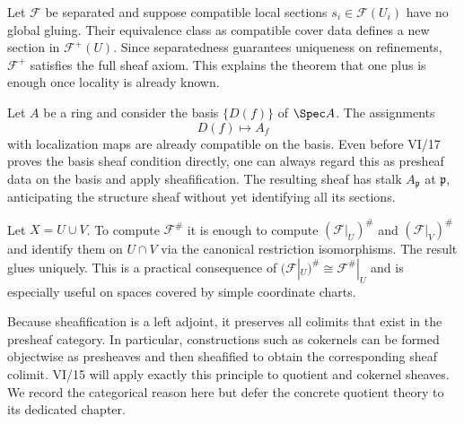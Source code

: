 \begin{example}
Let $\mathcal F$ be separated and suppose compatible local sections $s_i\in\mathcal F(U_i)$
have no global gluing.  Their equivalence class as compatible cover data defines a new
section in $\mathcal F^+(U)$.  Since separatedness guarantees uniqueness on refinements,
$\mathcal F^+$ satisfies the full sheaf axiom.  This explains the theorem that one plus is
enough once locality is already known.
\end{example}

\begin{example}
Let $A$ be a ring and consider the basis $\{D(f)\}$ of $\Spec A$.  The assignments
\[
D(f)\longmapsto A_f
\]
with localization maps are already compatible on the basis.  Even before VI/17 proves the
basis sheaf condition directly, one can always regard this as presheaf data on the basis and
apply sheafification.  The resulting sheaf has stalk $A_{\mathfrak p}$ at
$\mathfrak p$, anticipating the structure sheaf without yet identifying all its sections.
\end{example}

\begin{example}
Let $X=U\cup V$.  To compute $\mathcal F^\#$ it is enough to compute
$(\mathcal F|_U)^\#$ and $(\mathcal F|_V)^\#$ and identify them on $U\cap V$ via the
canonical restriction isomorphisms.  The result glues uniquely.  This is a practical
consequence of $(\mathcal F|_U)^\#\cong\mathcal F^\#|_U$ and is especially useful on spaces
covered by simple coordinate charts.
\end{example}

\begin{example}
Because sheafification is a left adjoint, it preserves all colimits that exist in the
presheaf category.  In particular, constructions such as cokernels can be formed objectwise
as presheaves and then sheafified to obtain the corresponding sheaf colimit.  VI/15 will
apply exactly this principle to quotient and cokernel sheaves.  We record the categorical
reason here but defer the concrete quotient theory to its dedicated chapter.
\end{example}
